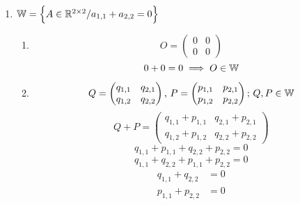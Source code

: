 \documentclass[../practica.root.tex]{subfiles}
\begin{document}
\begin{enumerate}
\begin{enumerate}
              \item $ \mathbb{W} = \Big\{ A \in \mathbb{R}^{2\times2} / a_{1,1} + a_{2,2} = 0 \Big\} $
                    \begin{enumerate}
                        \item \[
                                  O =
                                  \begin{pmatrix}
                                      0 & 0 \\
                                      0 & 0
                                  \end{pmatrix}
                              \]
                              \[ 0 + 0 = 0 \implies O \in \mathbb{W} \]
                        \item \[
                                  Q =
                                  \begin{pmatrix}
                                      q_{1,1} & q_{2,1} \\
                                      q_{1,2} & q_{2,2}
                                  \end{pmatrix}
                                  \text{, }
                                  P =
                                  \begin{pmatrix}
                                      p_{1,1} & p_{2,1} \\
                                      p_{1,2} & p_{2,2}
                                  \end{pmatrix}
                                  \text{; }
                                  Q, P \in \mathbb{W}
                              \]
                              \[
                                  Q + P =
                                  \begin{pmatrix}
                                      q_{1,1} + p_{1,1} & q_{2,1} + p_{2,1} \\
                                      q_{1,2} + p_{1,2} & q_{2,2} + p_{2,2}
                                  \end{pmatrix}
                              \]
                              \[ q_{1,1} + p_{1,1} + q_{2,2} + p_{2,2} = 0 \]
                              \[ q_{1,1} + q_{2,2} + p_{1,1} + p_{2,2} = 0 \]
                              \[
                                  \begin{array}{rl}
                                      q_{1,1} + q_{2,2} & = 0 \\
                                      p_{1,1} + p_{2,2} & = 0

\end{array}\]
\end{enumerate}
\end{enumerate}
\end{enumerate}
\end{document}
